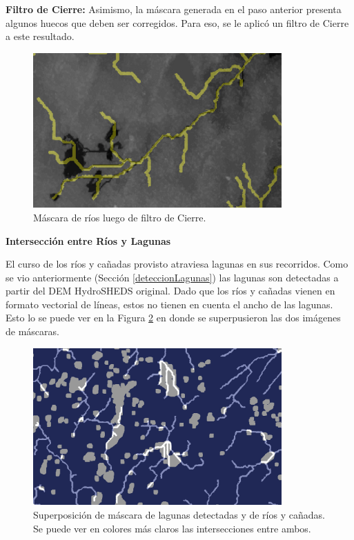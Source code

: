 \documentclass[10pt,a4paper, twoside]{report}
\begin{document}
\textbf{Filtro de Cierre:}  Asimismo, la máscara generada en el paso anterior presenta algunos huecos que deben ser corregidos. Para eso, se le aplicó un filtro de Cierre a este resultado.

\begin{figure}[H]
   \centering      
   \includegraphics[width=0.85\textwidth]{imagenes/riversEnroutedClosing.jpg}
 \caption{Máscara de ríos luego de filtro de Cierre.}
 \label{riversEnroutedClosing}
\end{figure}

\textbf{Intersección entre Ríos y Lagunas}

El curso de los ríos y cañadas provisto atraviesa lagunas en sus recorridos. Como se vio anteriormente (Sección \ref{deteccionLagunas}) las lagunas son detectadas a partir del DEM HydroSHEDS original. Dado que los ríos y cañadas vienen en formato vectorial de líneas, estos no tienen en cuenta el ancho de las lagunas. Esto lo se puede ver en la Figura \ref{lagunasSobreRios} en donde se superpusieron las dos imágenes de máscaras.

\begin{figure}[H]
   \centering      
   \includegraphics[width=0.85\textwidth]{imagenes/lagunasSobreRios.jpg}
 \caption{Superposición de máscara de lagunas detectadas y de ríos y cañadas. Se puede ver en colores más claros las intersecciones entre ambos.}
 \label{lagunasSobreRios}
\end{figure}
\end{document}
